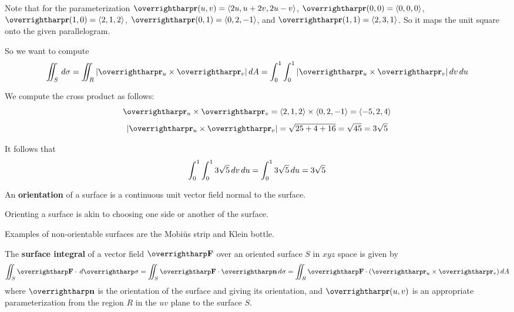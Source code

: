 \documentclass[letterpaper, twoside, 12pt]{book}
\begin{document}
          \begin{solution}
            Note that for the parameterization $\vect{r}(u,v)=\<2u,u+2v,2u-v\>$,
            $\vect{r}(0,0)=\<0,0,0\>$, $\vect{r}(1,0)=\<2,1,2\>$,
            $\vect{r}(0,1)=\<0,2,-1\>$, and $\vect{r}(1,1)=\<2,3,1\>$. So
            it maps the unit square onto the given parallelogram.

            So we want to compute
            \[
              \iint_S \dvar{\sigma}
                =
              \iint_R |\vect{r}_u\times\vect{r}_v|\dvar{A}
                =
              \int_0^1\int_0^1 |\vect{r}_u\times\vect{r}_v|\dvar{v}\dvar{u}
            \]

            We compute the cross product as follows:
            \[
              \vect{r}_u\times\vect{r}_v
                =
              \<2,1,2\>\times\<0,2,-1\>
                =
              \<-5,2,4\>
            \]
            \[
              |\vect{r}_u\times\vect{r}_v|
                =
              \sqrt{25+4+16}
                =
              \sqrt{45}
                =
              3\sqrt{5}
            \]

            It follows that
            \[
              \int_0^1\int_0^1 3\sqrt{5}\,d{v}\,d{u}
                =
              \int_0^1 3\sqrt{5}\,d{u}
                =
              3\sqrt{5}
            \]
          \end{solution}

\begin{definition}
  An \textbf{orientation} of a surface is a continuous unit
  vector field normal to the surface.
\end{definition}

\begin{remark}
  Orienting a surface is akin to choosing one side or another of the surface.
\end{remark}

\begin{remark}
  Examples of non-orientable surfaces are the Mobi\"us strip and Klein bottle.
\end{remark}

\begin{definition}
  The \textbf{surface integral} of a vector field $\vect{F}$ over an
  oriented surface $S$ in $xyz$ space is given by
  \[
    \iint_S \vect{F}\cdot\dvar{\vect\sigma}
      =
    \iint_S \vect{F}\cdot\vect{n}\dvar\sigma
      =
    \iint_R \vect{F}\cdot(\vect{r}_u\times\vect{r}_v)\dvar{A}
  \]
  where $\vect n$ is the orientation of the surface and giving
  its orientation, and
  $\vect{r}(u,v)$ is an appropriate parameterization from the region $R$ in
  the $uv$ plane to the surface $S$.
\end{definition}
\end{document}
